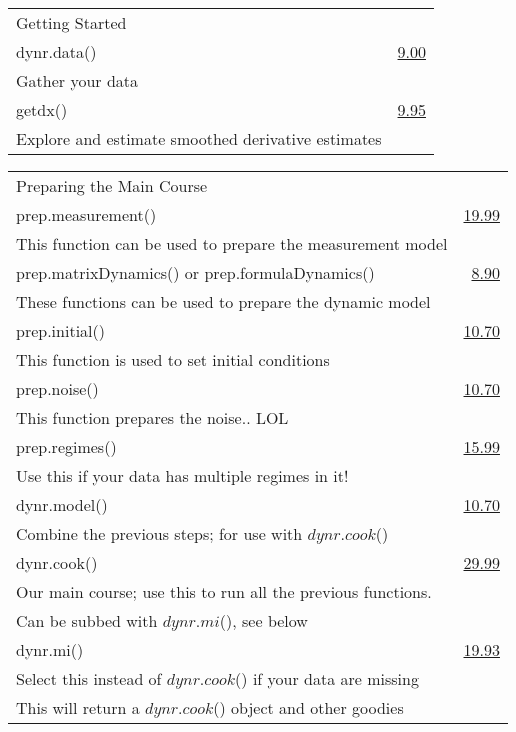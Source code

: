 \documentclass[12pt]{article}
\makeatletter
\newcommand*\ColText[1]{\textcolor{PennSky}{#1}}
\newenvironment{Group}[1]
  {\noindent\begin{tabular*}{\textwidth}{@{}p{.8\linewidth}@{\extracolsep{\fill}}r@{}}
    {\fontsize{22}{29}\selectfont\ColText{#1}}\\[0.8em]}
  {\end{tabular*}}
\newcommand*\Entry[2]{%
  \sffamily#1 & #2}
\newcommand*\Expl[1]{%
  \hspace*{1em}\footnotesize #1}
\makeatother
\begin{document}
	\\
\begin{Group}{Getting Started}
\Entry{dynr.data()}{\href{https://rdrr.io/cran/dynr/man/dynr.data.html}{9.00}} \\
\Expl{Gather your data} \\
\Entry{getdx()}{\href{https://rdrr.io/cran/dynr/man/getdx.html}{9.95}} \\
\Expl{Explore and estimate smoothed derivative estimates} \\
\end{Group}

\vspace{0.25cm}

\begin{Group}{Preparing the Main Course}
\Entry{prep.measurement()}{\href{https://rdrr.io/cran/dynr/man/prep.measurement.html}{19.99}} \\ 
\Expl{This function can be used to prepare the measurement model} \\
\Entry{prep.matrixDynamics() or prep.formulaDynamics()}{\href{https://rdrr.io/cran/dynr/man/prep.formulaDynamics.html}{8.90}} \\ 
\Expl{These functions can be used to prepare the dynamic model} \\ 
\Entry{prep.initial()}{\href{https://rdrr.io/cran/dynr/man/prep.initial.html}{10.70}} \\ 
\Expl{This function is used to set initial conditions} \\
\Entry{prep.noise()}{\href{https://rdrr.io/cran/dynr/man/prep.noise.html}{10.70}} \\ 
\Expl{This function prepares the noise.. LOL} \\
\Entry{[\emph{Optional}] prep.regimes()}{\href{https://rdrr.io/cran/dynr/man/prep.regimes.html}{15.99}} \\ 
\Expl{Use this if your data has multiple regimes in it!} \\
\Entry{dynr.model()}{\href{https://rdrr.io/cran/dynr/man/dynr.model.html}{10.70}} \\ 
\Expl{Combine the previous steps; for use with $dynr.cook$()} \\
\Entry{dynr.cook()}{\href{https://rdrr.io/cran/dynr/man/dynr.cook.html}{29.99}} \\ 
\Expl{Our main course; use this to run all the previous functions.}\\
\Expl{Can be subbed with $dynr.mi$(), see below} \\
\Entry{[\emph{Alternative}] dynr.mi()}\href{https://rdrr.io/cran/dynr/man/dynr.mi.html}{{19.93}} \\ 
\Expl{Select this instead of $dynr.cook$() if your data are missing}\\
\Expl{This will return a $dynr.cook$() object and other goodies} \\
\end{Group}
\end{document}
